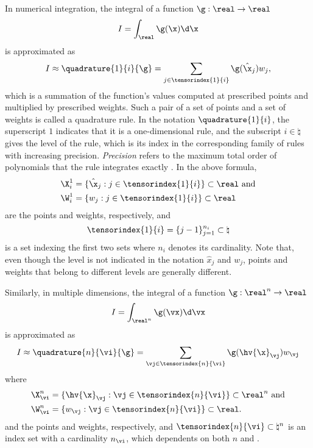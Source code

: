 In numerical integration, the integral of a function $\g: \real \to \real$
\[
  I = \int_\real \g(\x) \d \x
\]
is approximated as
\[
  I \approx \quadrature{1}{i}{\g} = \sum_{j \in \tensorindex{1}{i}} \g(\hat{\x}_j) w_j,
\]
which is a summation of the function's values computed at prescribed points and
multiplied by prescribed weights. Such a pair of a set of points and a set of
weights is called a quadrature rule. In the notation $\quadrature{1}{i}$, the
superscript $1$ indicates that it is a one-dimensional rule, and the subscript
$i \in \natural$ gives the level of the rule, which is its index in the
corresponding family of rules with increasing precision. \emph{Precision} refers
to the maximum total order of polynomials that the rule integrates exactly
\cite{heiss2008}. In the above formula,
\[
  \begin{split}
    & \X^1_i = \{ \hat{\x}_j: j \in \tensorindex{1}{i} \} \subset \real \text{ and} \\
    & \W^1_i = \{ w_j: j \in \tensorindex{1}{i} \} \subset \real
  \end{split}
\]
are the points and weights, respectively, and
\[
  \tensorindex{1}{i} = \{ j - 1 \}_{j = 1}^{n_i} \subset \natural
\]
is a set indexing the first two sets where $n_i$ denotes its cardinality. Note
that, even though the level is not indicated in the notation $\hat{x}_j$ and
$w_j$, points and weights that belong to different levels are generally
different.

Similarly, in multiple dimensions, the integral of a function $\g: \real^n \to
\real$
\[
  I = \int_{\real^n} \g(\vx) \d \vx
\]
is approximated as
\[
  I \approx \quadrature{n}{\vi}{\g} = \sum_{\vj \in \tensorindex{n}{\vi}} \g(\hv{\x}_{\vj}) w_{\vj}
\]
where
\[
  \begin{split}
    & \X^n_{\vi} = \{ \hv{\x}_{\vj}: \vj \in \tensorindex{n}{\vi} \} \subset \real^n \text{ and} \\
    & \W^n_{\vi} = \{ w_{\vj}: \vj \in \tensorindex{n}{\vi} \} \subset \real. \\
  \end{split}
\]
and the points and weights, respectively, and $\tensorindex{n}{\vi} \subset
\natural^n$ is an index set with a cardinality $n_{\vi}$, which dependents on
both $n$ and \vi.

